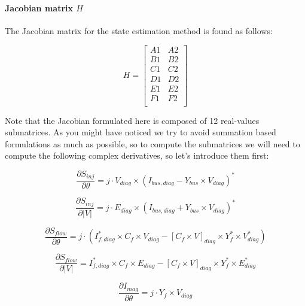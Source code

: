 \documentclass[a4paper,twoside,fleqn]{tufte-book}
\begin{document}
\paragraph{Jacobian matrix $H$}

The Jacobian matrix for the state estimation method is found as follows:

\begin{equation}
H=
\left[
\begin{array}{cc}
A1 &
A2 \\
B1 &
B2 \\
C1 &
C2 \\
D1 &
D2 \\
E1 &
E2 \\
F1 &
F2 \\
\end{array}
\right]
\label{SE_jacobian}
\end{equation}

Note that the Jacobian formulated here is composed of 12 real-values submatrices. As you might have noticed we try to avoid summation based formulations as much as possible, so to compute the submatrices we will need to compute the following complex derivatives, so let's introduce them first:


\begin{equation}
\frac{\partial S_{inj}}{\partial \theta} = j \cdot V_{diag} \times (I_{bus,diag}-Y_{bus} \times V_{diag}  )^* 
\end{equation}


\begin{equation}\frac{\partial S_{inj}}{\partial |V|}=j \cdot E_{diag} \times (I_{bus,diag} + Y_{bus} \times V_{diag}  )^* \end{equation}

\begin{equation}\frac{\partial S_{flow}}{\partial \theta} = j \cdot (I_{f,diag}^* \times C_f \times V_{diag} - [C_f \times V]_{diag} \times Y_f^* \times V_{diag}^* ) 
\end{equation}

\begin{equation}\frac{\partial S_{flow}}{\partial |V|}=I_{f,diag}^* \times C_f \times E_{diag}- [C_f \times V]_{diag} \times Y_f^* \times E_{diag}^* 
\end{equation}

\begin{equation}\frac{\partial I_{mag}}{\partial \theta} = j \cdot Y_f \times V_{diag} 
\end{equation}
\end{document}
